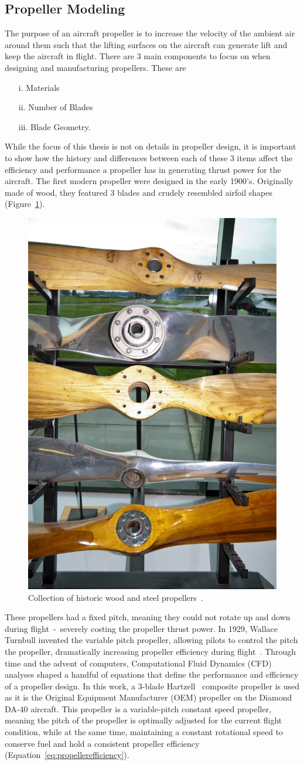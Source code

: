 \documentclass[12pt]{report}
\begin{document}
\subsection{Propeller Modeling}
The purpose of an aircraft propeller is to increase the velocity of the ambient air around them such that the lifting surfaces on the aircraft can generate lift and keep the aircraft in flight. There are 3 main components to focus on when designing and manufacturing propellers. These are
\begin{itemize}
  \item[i.] Materials
  \item[ii.] Number of Blades
  \item[iii.] Blade Geometry.
\end{itemize}
While the focus of this thesis is not on details in propeller design, it is important to show how the history and differences between each of these 3 items affect the efficiency and performance a propeller has in generating thrust power for the aircraft. The first modern propeller were designed in the early 1900's. Originally made of wood, they featured 3 blades and crudely resembled airfoil shapes (Figure~\ref{fig:woodprops}).

\begin{figure}[!ht]\label{fig:woodprops}
  \centering
  \includegraphics[width=0.3\linewidth]{Figures/woodProps.jpg}
  \caption{Collection of historic wood and steel propellers~\cite{ianHowIdentifyHistoric2016}.}
\end{figure}

These propellers had a fixed pitch, meaning they could not rotate up and down during flight~-~severely costing the propeller thrust power. In 1929, Wallace Turnbull invented the variable pitch propeller, allowing pilots to control the pitch the propeller, dramatically increasing propeller efficiency during flight~\cite{ianShortHistoryAircraft2018}. Through time and the advent of computers, Computational Fluid Dynamics (CFD) analyses shaped a handful of equations that define the performance and efficiency of a propeller design. In this work, a 3-blade Hartzell~\cite{HartzellPropellerInc} composite propeller is used as it is the Original Equipment Manufacturer (OEM) propeller on the Diamond DA-40 aircraft. This propeller is a variable-pitch constant speed propeller, meaning the pitch of the propeller is optimally adjusted for the current flight condition, while at the same time, maintaining a constant rotational speed to conserve fuel and hold a consistent propeller efficiency (Equation~\ref{eq:propellerefficiency}).
\end{document}
